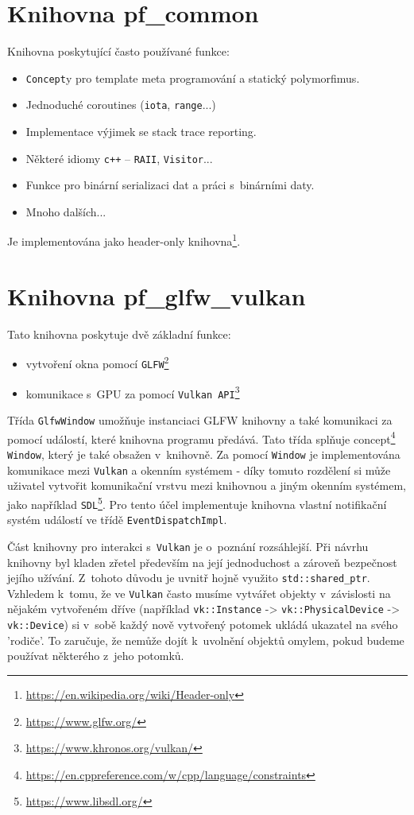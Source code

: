 \section{Knihovna pf\_common}
Knihovna poskytující často používané funkce:
\begin{itemize}
	\item \texttt{Concept}y pro template meta programování a statický polymorfimus.
	\item Jednoduché coroutines (\texttt{iota}, \texttt{range}...)
	\item Implementace výjimek se stack trace reporting.
	\item Některé idiomy \texttt{c++} -- \texttt{RAII}, \texttt{Visitor}...
	\item Funkce pro binární serializaci dat a práci s~binárními daty.
	\item Mnoho dalších...
\end{itemize}

Je implementována jako header-only knihovna\footnote{\url{https://en.wikipedia.org/wiki/Header-only}}.

\section{Knihovna pf\_glfw\_vulkan}
Tato knihovna poskytuje dvě základní funkce:
\begin{itemize}
	\item vytvoření okna pomocí \texttt{GLFW}\footnote{\url{https://www.glfw.org/}}
	\item komunikace s~GPU za pomocí \texttt{Vulkan API}\footnote{\url{https://www.khronos.org/vulkan/}}
\end{itemize}

Třída \texttt{GlfwWindow} umožňuje instanciaci GLFW knihovny a také komunikaci za pomocí událostí, které knihovna programu předává. Tato třída splňuje concept\footnote{\url{https://en.cppreference.com/w/cpp/language/constraints}} \texttt{Window}, který je také obsažen v~knihovně. Za pomocí \texttt{Window} je implementována komunikace mezi \texttt{Vulkan} a okenním systémem - díky tomuto rozdělení si může uživatel vytvořit komunikační vrstvu mezi knihovnou a jiným okenním systémem, jako například \texttt{SDL}\footnote{\url{https://www.libsdl.org/}}. Pro tento účel implementuje knihovna vlastní notifikační systém událostí ve třídě \texttt{EventDispatchImpl}.

Část knihovny pro interakci s~\texttt{Vulkan} je o~poznání rozsáhlejší. Při návrhu knihovny byl kladen zřetel především na její jednoduchost a zároveň bezpečnost jejího užívání. Z~tohoto důvodu je uvnitř hojně využito \texttt{std::shared\_ptr}. Vzhledem k~tomu, že ve \texttt{Vulkan} často musíme vytvářet objekty v~závislosti na nějakém vytvořeném dříve (například \texttt{vk::Instance} -> \texttt{vk::PhysicalDevice} -> \texttt{vk::Device}) si v~sobě každý nově vytvořený potomek ukládá ukazatel na svého 'rodiče'. To zaručuje, že nemůže dojít k~uvolnění objektů omylem, pokud budeme používat některého z~jeho potomků.

